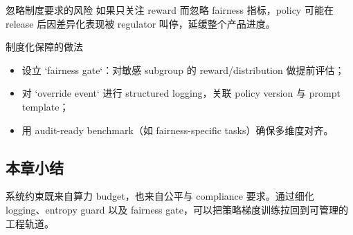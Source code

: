 \begin{warningbox}{忽略制度要求的风险}
如果只关注 reward 而忽略 fairness 指标，policy 可能在 release 后因差异化表现被 regulator 叫停，延缓整个产品进度。
\end{warningbox}

\begin{knowledgebox}{制度化保障的做法}
\begin{itemize}
    \item 设立 `fairness gate`：对敏感 subgroup 的 reward/distribution 做提前评估；
    \item 对 `override event` 进行 structured logging，关联 policy version 与 prompt template；
    \item 用 audit-ready benchmark（如 fairness-specific tasks）确保多维度对齐。
\end{itemize}
\end{knowledgebox}

\subsection{本章小结}
系统约束既来自算力 budget，也来自公平与 compliance 要求。通过细化 logging、entropy guard 以及 fairness gate，可以把策略梯度训练拉回到可管理的工程轨道。

